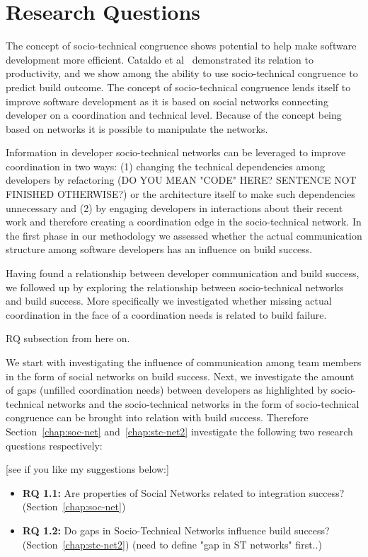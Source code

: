 \section{Research Questions}
The concept of socio-technical congruence shows potential to help make software development more efficient.
Cataldo et al~\cite{cataldo:cscw:2006} demonstrated its relation to productivity, and we show among the ability to use socio-technical congruence to predict build outcome.
The concept of socio-technical congruence lends itself to improve software development as it is based on social networks connecting developer on a coordination and technical level.
Because of the concept being based on networks it is possible to manipulate the networks.

Information in developer socio-technical networks can be leveraged to improve coordination in two ways: (1) changing the technical dependencies among developers by refactoring (DO YOU MEAN "CODE" HERE? SENTENCE NOT FINISHED OTHERWISE?) or the architecture itself  to make such dependencies unnecessary and (2) by engaging developers in interactions about their recent work and therefore creating a coordination edge in the socio-technical network.
In the first phase in our methodology we assessed whether the actual communication structure among software developers has an influence on build success. 

Having found a relationship between developer communication and build success, we followed up by exploring the relationship between socio-technical networks and build success. More specifically we investigated whether missing actual coordination in the face of a coordination needs is related to build failure.


RQ subsection from here on. 

We start with investigating the influence of communication among team members in the form of social networks on build success.
Next, we investigate the amount of gaps (unfilled coordination needs) between developers as highlighted by socio-technical networks and the socio-technical networks in the form of socio-technical congruence can be brought into relation with build success.
Therefore Section~\ref{chap:soc-net} and~\ref{chap:stc-net2} investigate the following two research questions respectively:

[see if you like my suggestions below:]
\begin{itemize}
  \item\textbf{RQ 1.1:} Are properties of Social Networks related to integration success? (Section~\ref{chap:soc-net})
  \item\textbf{RQ 1.2:} Do gaps in Socio-Technical Networks influence build success? (Section~\ref{chap:stc-net2}) (need to define "gap in ST networks" first..)
\end{itemize}

